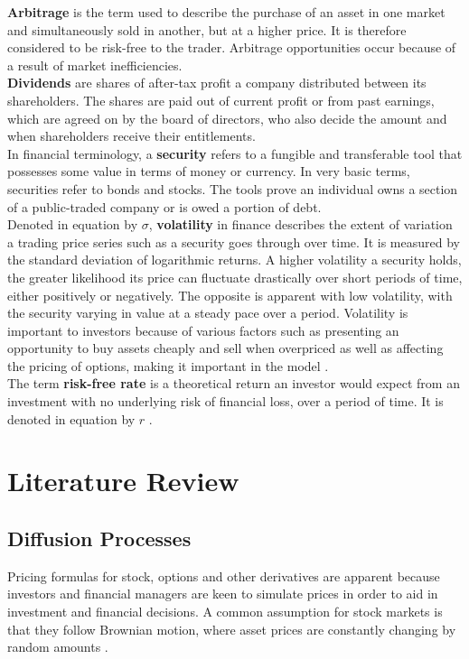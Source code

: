 \documentclass[12pt]{article}
\begin{document}
\textbf{Arbitrage} is the term used to describe the purchase of an asset in one market and simultaneously sold in another, but at a higher price. It is therefore considered to be risk-free to the trader. Arbitrage opportunities occur because of a result of market inefficiencies. 
\\

\textbf{Dividends} are shares of after-tax profit a company distributed between its shareholders. The shares are paid out of current profit or from past earnings, which are agreed on by the board of directors, who also decide the amount and when shareholders receive their entitlements. 
\\

In financial terminology, a \textbf{security} refers to a fungible and transferable tool that possesses some value in terms of money or currency. In very basic terms, securities refer to bonds and stocks. The tools prove an individual owns a section of a public-traded company or is owed a portion of debt. 
\\

Denoted in equation by $\sigma$, \textbf{volatility} in finance describes the extent of variation a trading price series such as a security goes through over time. It is measured by the standard deviation of logarithmic returns. A higher volatility a security holds, the greater likelihood its price can fluctuate drastically over short periods of time, either positively or negatively. The opposite is apparent with low volatility, with the security varying in value at a steady pace over a period. Volatility is important to investors because of various factors such as presenting an opportunity to buy assets cheaply and sell when overpriced as well as affecting the pricing of options, making it important in the \cite{BSReport} model \citep{Volatility}. 
\\

The term \textbf{risk-free rate} is a theoretical return an investor would expect from an investment with no underlying risk of financial loss, over a period of time. It is denoted in equation by $r$ \citep{Maths}.

\section{Literature Review} \label{LitReview}
\subsection{Diffusion Processes}
Pricing formulas for stock, options and other derivatives are apparent because investors and financial managers are keen to simulate prices in order to aid in investment and financial decisions. A common assumption for stock markets is that they follow Brownian motion, where asset prices are constantly changing by random amounts \citep{Ermogenous}.
 
\end{document}
